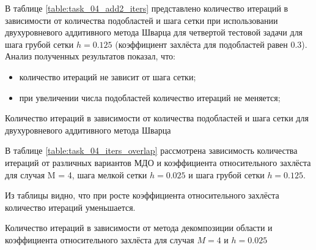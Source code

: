 \documentclass[a4paper]{article}
\begin{document}
В таблице \ref{table:task_04_add2_iters} представлено количество итераций в зависимости от количества подобластей и шага сетки при использовании двухуровневого аддитивного метода Шварца для четвертой тестовой задачи для шага грубой сетки $h = 0.125$ (коэффициент захлёста для подобластей равен 0.3). Анализ полученных результатов показал, что:
\begin{itemize}
\item количество итераций не зависит от шага сетки;
\item при увеличении числа подобластей количество итераций не меняется;
\end{itemize}

\begin{table}[h]
\caption{Количество итераций в зависимости от количества подобластей и шага сетки для двухуровневого аддитивного метода Шварца}
\label{table:task_04_add2_iters}
\end{table}

В таблице \ref{table:task_04_iters_overlap} рассмотрена зависимость количества итераций от различных вариантов МДО и коэффициента относительного захлёста для случая M = 4, шага мелкой сетки $h = 0.025$ и шага грубой сетки $h = 0.125$. 

Из таблицы видно, что при росте коэффициента относительного захлёста количество итераций уменьшается.

\begin{table}[h]
\caption{Количество итераций в зависимости от метода декомпозиции области и коэффициента относительного захлёста для случая $M = 4$ и $h = 0.025$}
\label{table:task_04_iters_overlap}
\end{table}
\end{document}
